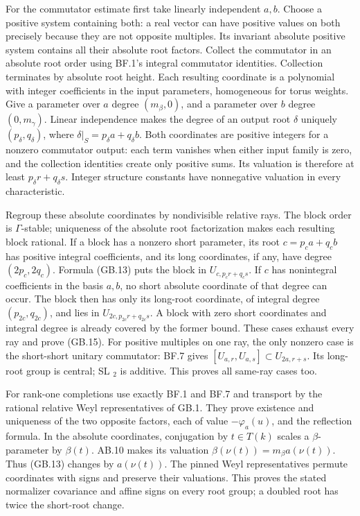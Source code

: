 \documentclass[
  11pt,
]{article}
\begin{document}
For the commutator estimate first take linearly independent \(a,b\).
Choose a positive system containing both: a real vector can have
positive values on both precisely because they are not opposite
multiples. Its invariant absolute positive system contains all their
absolute root factors. Collect the commutator in an absolute root order
using BF.1's integral commutator identities. Collection terminates by
absolute root height. Each resulting coordinate is a polynomial with
integer coefficients in the input parameters, homogeneous for torus
weights. Give a parameter over \(a\) degree \((m_\beta,0)\), and a
parameter over \(b\) degree \((0,m_\gamma)\). Linear independence makes
the degree of an output root \(\delta\) uniquely
\((p_\delta,q_\delta)\), where \(\delta|_S=p_\delta a+q_\delta b\). Both
coordinates are positive integers for a nonzero commutator output: each
term vanishes when either input family is zero, and the collection
identities create only positive sums. Its valuation is therefore at
least \(p_\delta r+q_\delta s\). Integer structure constants have
nonnegative valuation in every characteristic.

Regroup these absolute coordinates by nondivisible relative rays. The
block order is \(\Gamma\)-stable; uniqueness of the absolute root
factorization makes each resulting block rational. If a block has a
nonzero short parameter, its root \(c=p_ca+q_cb\) has positive integral
coefficients, and its long coordinates, if any, have degree
\((2p_c,2q_c)\). Formula (GB.13) puts the block in \(U_{c,p_cr+q_cs}\).
If \(c\) has nonintegral coefficients in the basis \(a,b\), no short
absolute coordinate of that degree can occur. The block then has only
its long-root coordinate, of integral degree \((p_{2c},q_{2c})\), and
lies in \(U_{2c,p_{2c}r+q_{2c}s}\). A block with zero short coordinates
and integral degree is already covered by the former bound. These cases
exhaust every ray and prove (GB.15). For positive multiples on one ray,
the only nonzero case is the short-short unitary commutator: BF.7 gives
\([U_{a,r},U_{a,s}]\subset U_{2a,r+s}\). Its long-root group is central;
SL \(_2\) is additive. This proves all same-ray cases too.

For rank-one completions use exactly BF.1 and BF.7 and transport by the
rational relative Weyl representatives of GB.1. They prove existence and
uniqueness of the two opposite factors, each of value \(-\varphi_a(u)\),
and the reflection formula. In the absolute coordinates, conjugation by
\(t\in T(k)\) scales a \(\beta\)-parameter by \(\beta(t)\). AB.10 makes
its valuation \(\beta(\nu(t))=m_\beta a(\nu(t))\). Thus (GB.13) changes
by \(a(\nu(t))\). The pinned Weyl representatives permute coordinates
with signs and preserve their valuations. This proves the stated
normalizer covariance and affine signs on every root group; a doubled
root has twice the short-root change.
\end{document}
